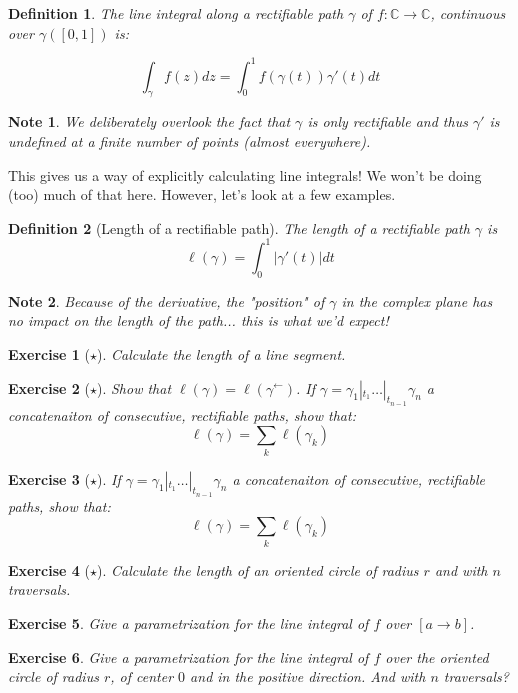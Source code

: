 \documentclass{article}
\newtheorem*{defi}{Definition}
\newtheorem*{note}{Note}
\newtheorem{exo}{Exercise}
\begin{document}
\begin{defi}
    The line integral along a rectifiable path $\gamma$ of $f:\mathbb{C} \rightarrow \mathbb{C}$, continuous over $\gamma([0,1])$ is:

    $$ \int_\gamma f(z)dz = \int_0^1 f(\gamma(t))\gamma'(t)dt$$
\end{defi}

\begin{note}
    We deliberately overlook the fact that $\gamma$ is only rectifiable and thus $\gamma'$ is undefined at a finite number of points (almost everywhere). 
\end{note}

This gives us a way of explicitly calculating line integrals! We won't be doing (too) much of that here. However, let's look at a few examples.

\begin{defi}[Length of a rectifiable path]
    The length of a rectifiable path $\gamma$ is 
    $$ \ell(\gamma) = \int_0^1 |\gamma'(t)|dt$$
\end{defi}

\begin{note}
    Because of the derivative, the "position" of $\gamma$ in the complex plane has no impact on the length of the path... this is what we'd expect!
\end{note}

\begin{exo}[$\star$]
    Calculate the length of a line segment. 
\end{exo}
\begin{exo}[$\star$]
    Show that $\ell(\gamma) = \ell(\gamma^{\leftarrow})$.
    If $\gamma = \gamma_1 |_{t_1} \dots |_{t_{n-1}} \gamma_n$ a concatenaiton of consecutive, rectifiable paths, show that:
    $$ \ell(\gamma) = \sum_k{\ell(\gamma_k)}$$
\end{exo}
\begin{exo}[$\star$]
    If $\gamma = \gamma_1 |_{t_1} \dots |_{t_{n-1}} \gamma_n$ a concatenaiton of consecutive, rectifiable paths, show that:
    $$ \ell(\gamma) = \sum_k{\ell(\gamma_k)}$$
\end{exo}
\begin{exo}[$\star$]
    Calculate the length of an oriented circle of radius $r$ and with $n$ traversals.
\end{exo}
\begin{exo}
    Give a parametrization for the line integral of $f$ over $[a \rightarrow b]$.
\end{exo}
\begin{exo}
    Give a parametrization for the line integral of $f$ over the oriented circle of radius $r$, of center $0$ and in the positive direction. And with $n$ traversals?
\end{exo}
\end{document}
